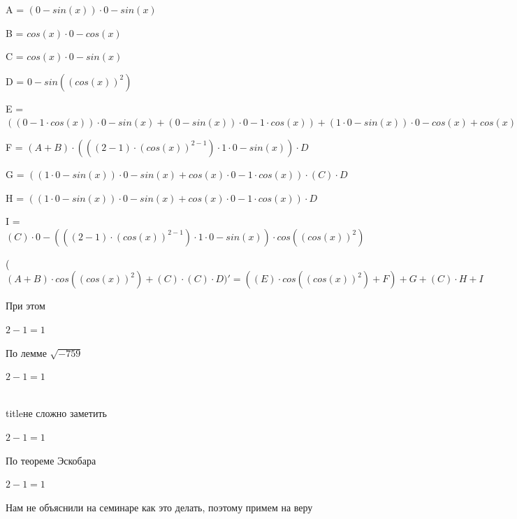 \documentclass[12pt,a4paper,fleqn]{article}
\begin{document}
\begin{center}
A = $(0-sin(x)) \cdot 0-sin(x)$\end{center}
\begin{center}
B = $cos(x) \cdot 0-cos(x)$\end{center}
\begin{center}
C = $cos(x) \cdot 0-sin(x)$\end{center}
\begin{center}
D = $0-sin((cos(x))^{2})$\end{center}
\begin{center}
E = $((0-1 \cdot cos(x)) \cdot 0-sin(x)+(0-sin(x)) \cdot 0-1 \cdot cos(x))+(1 \cdot 0-sin(x)) \cdot 0-cos(x)+cos(x) \cdot 0-1 \cdot 0-sin(x)$\end{center}
\begin{center}
F = $(A+B) \cdot (((2-1) \cdot (cos(x))^{2-1}) \cdot 1 \cdot 0-sin(x)) \cdot D$\end{center}
\begin{center}
G = $((1 \cdot 0-sin(x)) \cdot 0-sin(x)+cos(x) \cdot 0-1 \cdot cos(x)) \cdot (C) \cdot D$\end{center}
\begin{center}
H = $((1 \cdot 0-sin(x)) \cdot 0-sin(x)+cos(x) \cdot 0-1 \cdot cos(x)) \cdot D$\end{center}
\begin{center}
I = $(C) \cdot 0-(((2-1) \cdot (cos(x))^{2-1}) \cdot 1 \cdot 0-sin(x)) \cdot cos((cos(x))^{2})$\end{center}
\begin{center}
 ($(A+B) \cdot cos((cos(x))^{2})+(C) \cdot (C) \cdot D)'
  = ((E) \cdot cos((cos(x))^{2})+F)+G+(C) \cdot H+I$\end{center}
При этом

\begin{center}$2-1 = 1$\end{center}
По лемме $\sqrt{-759}$
\begin{center}$2-1 = 1$\end{center}
\\ title{не сложно заметить} 

\begin{center}$2-1 = 1$\end{center}
По теореме Эскобара

\begin{center}$2-1 = 1$\end{center}
Нам не объяснили на семинаре как это делать, поэтому примем на веру
\end{document}
